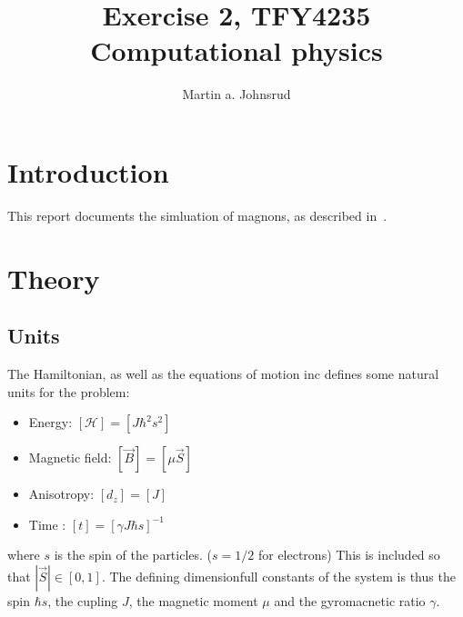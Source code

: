 \documentclass{article}
\title{Exercise 2, TFY4235 Computational physics}
\author{Martin a. Johnsrud}
\date{}
\begin{document}
    \maketitle
    \section*{Introduction}
    This report documents the simluation of magnons, as described in~\cite{exercise}.

    \section*{Theory}
    \subsection*{Units}
    The Hamiltonian, as well as the equations of motion inc \cite{exercise} defines some natural units for the problem: 
    \begin{itemize}
        \item Energy: $[\mathcal H] = [J \hbar^2 s^2]$
        \item Magnetic field: $[\vec B] = [\mu \vec S ]$
        \item Anisotropy: $[d_z] = [J]$
        \item Time : $[t] = [\gamma J \hbar s]^{-1}$
    \end{itemize}
     where $s$ is the spin of the particles. ($s=1/2$ for electrons) This is included so that $|\vec S|\in[0, 1]$. The defining dimensionfull constants of the system is thus the spin $\hbar s$, the cupling $J$, the magnetic moment $\mu$ and the gyromacnetic ratio $\gamma$.
\end{document}
